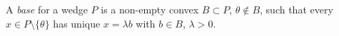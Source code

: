 A \emph{base} for a wedge $P$ is a non-empty convex $B\subset P$, $\theta\notin B$, such that every $x\in P\setminus\{\theta\}$ has unique $x=\lambda b$ with $b\in B$, $\lambda>0$.
